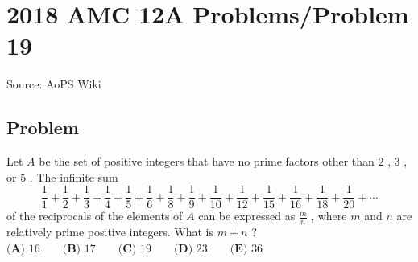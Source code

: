 \documentclass[12pt]{article}
\begin{document}
\section*{{2018 AMC 12A Problems/Problem 19}}
Source: AoPS Wiki

\subsection*{Problem}
Let $A$ be the set of positive integers that have no prime factors other than $2$ , $3$ , or $5$ . The infinite sum \[\frac{1}{1} + \frac{1}{2} + \frac{1}{3} + \frac{1}{4} + \frac{1}{5} + \frac{1}{6} + \frac{1}{8} + \frac{1}{9} + \frac{1}{10} + \frac{1}{12} + \frac{1}{15} + \frac{1}{16} + \frac{1}{18} + \frac{1}{20} + \cdots\] of the reciprocals of the elements of $A$ can be expressed as $\frac{m}{n}$ , where $m$ and $n$ are relatively prime positive integers. What is $m+n$ ? $\textbf{(A) } 16 \qquad \textbf{(B) } 17 \qquad \textbf{(C) } 19 \qquad \textbf{(D) } 23 \qquad \textbf{(E) } 36$
\end{document}
